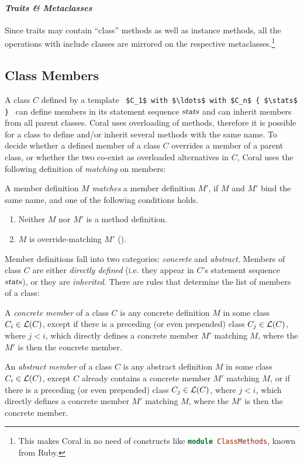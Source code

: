 \paragraph{\em Traits \& Metaclasses}
Since traits may contain ``class'' methods as well as instance methods, all the operations with include classes are mirrored on the respective metaclasses.\footnote{This makes Coral in no need of constructs like \lstinline[language=Ruby]!module ClassMethods!, known from Ruby.}





\subsection{Class Members}
\label{sec:class-members}

A class $C$ defined by a template ~\lstinline!$C_1$ with $\ldots$ with $C_n$ { $\stats$ }!~ can define members in its statement sequence $\mbox{\sl stats}$ and can inherit members from all parent classes. Coral uses overloading of methods, therefore it is possible for a class to define and/or inherit several methods with the same name. To decide whether a defined member of a class $C$ overrides a member of a parent class, or whether the two co-exist as overloaded alternatives in $C$, Coral uses the following definition of {\em matching} on members:

\begin{definition}
A member definition $M$ {\em matches} a member definition $M'$, if $M$ and $M'$ bind the same name, and one of the following conditions holds.
\begin{enumerate}
\item Neither $M$ nor $M'$ is a method definition.
\item $M$ is override-matching $M'$ (). 
\end{enumerate}
\end{definition}

Member definitions fall into two categories: {\em concrete} and {\em abstract}. Members of class $C$ are either {\em directly defined} (i.e. they appear in $C$'s statement sequence $\mbox{\sl stats}$), or they are {\em inherited}. There are rules that determine the list of members of a class:

\begin{definition}
A {\em concrete member} of a class $C$ is any concrete definition $M$ in some class $C_i \in {\cal L}(C)$, except if there is a preceding (or even prepended) class $C_j \in {\cal L}(C)$, where $j < i$, which directly defines a concrete member $M'$ matching $M$, where the $M'$ is then the concrete member. 

An {\em abstract member} of a class $C$ is any abstract definition $M$ in some class $C_i \in {\cal L}(C)$, except $C$ already contains a concrete member $M'$ matching $M$, or if there is a preceding (or even prepended) class $C_j \in {\cal L}(C)$, where $j < i$, which directly defines a concrete member $M'$ matching $M$, where the $M'$ is then the concrete member. 
\end{definition}

